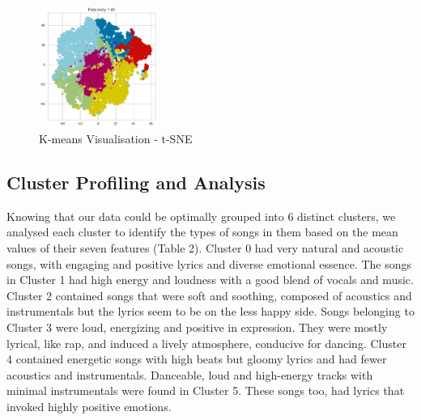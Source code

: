 \documentclass{article}
\begin{document}
\begin{figure}[H]
\centering
\begin{minipage}{.5\textwidth}
  \centering
\label{tab:sadassdasaa}
\end{minipage}%
\begin{minipage}{.5\textwidth}
  \centering
  \includegraphics[width=39mm]{Images/t-SNE Kmeans.png}
  \caption{K-means Visualisation - t-SNE}
  \label{fig:SSASAX}
\end{minipage}
\end{figure}

\subsection{Cluster Profiling and Analysis}

Knowing that our data could be optimally grouped into 6 distinct clusters, we analysed each cluster to identify the types of songs in them based on the mean values of their seven features (Table 2). Cluster 0 had very natural and acoustic songs, with engaging and positive lyrics and diverse emotional essence. The songs in Cluster 1 had high energy and loudness with a good blend of vocals and music. Cluster 2 contained songs that were soft and soothing, composed of acoustics and instrumentals but the lyrics seem to be on the less happy side. Songs belonging to Cluster 3 were loud, energizing and positive in expression. They were mostly lyrical, like rap, and induced a lively atmosphere, conducive for dancing. Cluster 4 contained energetic songs with high beats but gloomy lyrics and had fewer acoustics and instrumentals. Danceable, loud and high-energy tracks with minimal instrumentals were found in Cluster 5. These songs too, had lyrics that invoked highly positive emotions. 
\end{document}
